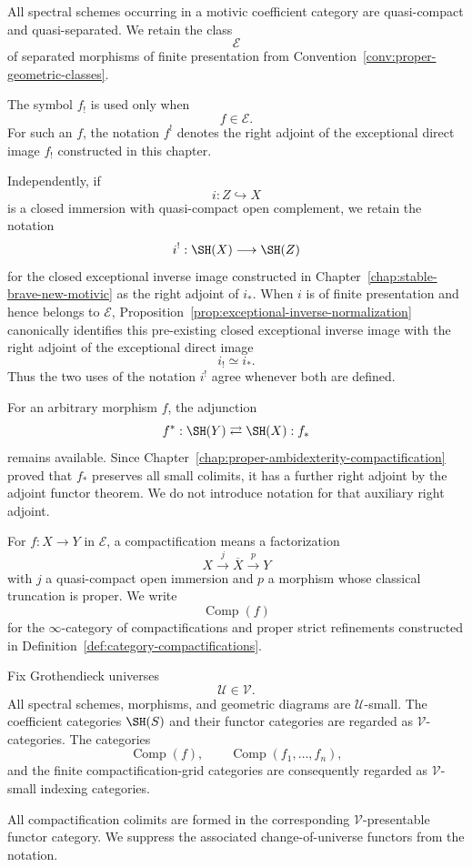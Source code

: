 \begin{convention}
\label{conv:six-exceptional-morphisms}
All spectral schemes occurring in a motivic coefficient category are
quasi-compact and quasi-separated.  We retain the class
\[
    \mathcal E
\]
of separated morphisms of finite presentation from
Convention~\ref{conv:proper-geometric-classes}.

The symbol \(f_!\) is used only when
\[
    f\in\mathcal E.
\]
For such an \(f\), the notation \(f^!\) denotes the right adjoint of the
exceptional direct image \(f_!\) constructed in this chapter.

Independently, if
\[
    i:Z\hookrightarrow X
\]
is a closed immersion with quasi-compact open complement, we retain the
notation
\[
    i^!:\SH(X)\longrightarrow\SH(Z)
\]
for the closed exceptional inverse image constructed in
Chapter~\ref{chap:stable-brave-new-motivic} as the right adjoint of
\(i_*\).  When \(i\) is of finite presentation and hence belongs to
\(\mathcal E\), Proposition~\ref{prop:exceptional-inverse-normalization}
canonically identifies this pre-existing closed exceptional inverse image
with the right adjoint of the exceptional direct image
\[
    i_!\simeq i_*.
\]
Thus the two uses of the notation \(i^!\) agree whenever both are defined.

For an arbitrary morphism \(f\), the adjunction
\[
    f^*:\SH(Y)
    \rightleftarrows
    \SH(X):f_*
\]
remains available.  Since
Chapter~\ref{chap:proper-ambidexterity-compactification}
proved that \(f_*\) preserves all small colimits, it has a further right
adjoint by the adjoint functor theorem.  We do not introduce notation for
that auxiliary right adjoint.
\end{convention}

\begin{convention}[Compactifications]
\label{conv:six-compactifications}
For \(f:X\to Y\) in \(\mathcal E\), a compactification means a factorization
\[
    X\xrightarrow{j}\overline X\xrightarrow{p}Y
\]
with \(j\) a quasi-compact open immersion and \(p\) a morphism whose
classical truncation is proper.  We write
\[
    \operatorname{Comp}(f)
\]
for the \(\infty\)-category of compactifications and proper strict
refinements constructed in
Definition~\ref{def:category-compactifications}.
\end{convention}

\begin{convention}
\label{conv:six-compactification-universes}
Fix Grothendieck universes
\[
    \mathcal U\in\mathcal V.
\]
All spectral schemes, morphisms, and geometric diagrams are
\(\mathcal U\)-small.  The coefficient categories
\(\SH(S)\) and their functor categories are regarded as
\(\mathcal V\)-categories.  The categories
\[
    \operatorname{Comp}(f),
    \qquad
    \operatorname{Comp}(f_1,\ldots,f_n),
\]
and the finite compactification-grid categories are consequently regarded
as \(\mathcal V\)-small indexing categories.

All compactification colimits are formed in the corresponding
\(\mathcal V\)-presentable functor category.  We suppress the associated
change-of-universe functors from the notation.
\end{convention}


